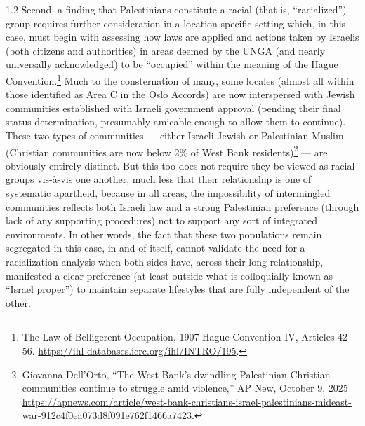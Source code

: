 \documentclass[../unravbook.tex]{subfiles}
\begin{document}
\begin{spacing}{1.2}
Second, a finding that Palestinians constitute a racial (that is, \enquote{racialized}) group requires further consideration in a location-specific setting which, in this case, must begin with assessing how laws are applied and actions taken by Israelis (both citizens and authorities) in areas deemed by the UNGA (and nearly universally acknowledged) to be \enquote{occupied} within the meaning of the Hague Convention.\footnote{The Law of Belligerent Occupation, 1907 Hague Convention IV, Articles 42--56. \url{https://ihl-databases.icrc.org/ihl/INTRO/195}.}  Much to the consternation of many, some locales (almost all within those identified as Area C in the Oslo Accords) are now interspersed with Jewish communities established with Israeli government approval (pending their final status determination, presumably amicable enough to allow them to continue). These two types of communities --- either Israeli Jewish or Palestinian Muslim (Christian communities are now below 2\% of West Bank residents)\footnote{Giovanna Dell'Orto, \enquote{The West Bank's dwindling Palestinian Christian communities continue to struggle amid violence,} AP New, October 9, 2025 \url{https://apnews.com/article/west-bank-christians-israel-palestinians-mideast-war-912c4f0ea073d8f091e762f1466a7423}.}  --- are obviously entirely distinct. But this too does not require they be viewed as racial groups vis-à-vis one another, much less that their relationship is one of systematic apartheid, because in all areas, the impossibility of intermingled communities reflects both Israeli law and a strong Palestinian preference (through lack of any supporting procedures) not to support any sort of integrated environments. In other words, the fact that these two populations remain segregated in this case, in and of itself, cannot validate the need for a racialization analysis when both sides have, across their long relationship, manifested a clear preference (at least outside what is colloquially known as \enquote{Israel proper}) to maintain separate lifestyles that are fully independent of the other.
 

\end{spacing}
\end{document}

